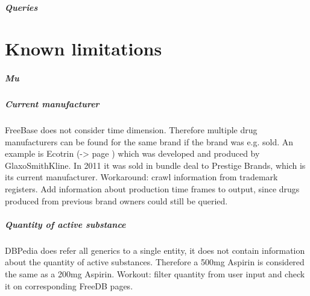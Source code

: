 \documentclass[11pt,titlepage,oneside,openany]{book}
\begin{document}
\paragraph{Queries}
\label{sec:query}



\label{ex:ecotrin}


\chapter{Known limitations}
\label{cha:limiations}



\paragraph{Mu}



\paragraph{Current manufacturer}
FreeBase does not consider time dimension. Therefore multiple drug manufacturers can be found for the same brand if the brand was e.g. sold. An example is Ecotrin (-> page \pageref{ex:ecotrin}) which was developed and produced by GlaxoSmithKline. In 2011 it was sold in bundle deal to Prestige Brands, which is its current manufacturer.
Workaround: crawl information from trademark registers. Add information about production time frames to output, since drugs produced from previous brand owners could still be queried.

\paragraph{Quantity of active substance}
DBPedia does refer all generics to a single entity, it does not contain information about the quantity of active substances. Therefore a 500mg Aspirin is considered the same as a 200mg Aspirin.
Workout: filter quantity from user input and check it on corresponding FreeDB pages.
\end{document}
